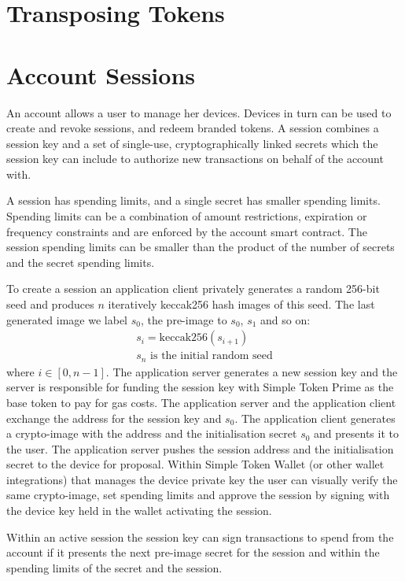 \documentclass[12pt,a4paper, twocolumn]{article}
\begin{document}
\section{Transposing Tokens}

\section{Account Sessions}

An account allows a user to manage her devices. Devices in turn
can be used to create and revoke sessions, and redeem branded
tokens.  A session combines a session key and a set of single-use,
cryptographically linked secrets which the session key can include
to authorize new transactions on behalf of the account with.

A session has spending limits, and a single secret has smaller
spending limits. Spending limits can be a combination of amount
restrictions, expiration or frequency constraints and are enforced
by the account smart contract. The session spending limits can be
smaller than the product of the number of secrets and the secret
spending limits.

To create a session an application client privately generates
a random 256-bit seed and produces $n$ iteratively keccak256 hash
images of this seed.  The last generated image we label $s_0$,
the pre-image to $s_0$, $s_1$ and so on:
\begin{align}
	s_i = \text{keccak256}(s_{i+1}) \\
	s_n \text{ is the initial random seed} \nonumber
\end{align}
where $i \in [0, n-1]$.
The application server generates a new session key and the server
is responsible for funding the session key with Simple Token Prime
as the base token to pay for gas costs.  The application server and
the application client exchange the address for the session key and
$s_0$.  The application client generates a crypto-image with the address
and the initialisation secret $s_0$ and presents it to the user.
The application server pushes the session address and the initialisation
secret to the device for proposal.
Within Simple Token Wallet (or other wallet integrations) that
manages the device private key the user can visually verify the same
crypto-image, set spending limits and approve the session by signing
with the device key held in the wallet activating the session.

Within an active session the session key can sign transactions to spend
from the account if it presents the next pre-image secret for the session
and within the spending limits of the secret and the session.
\end{document}
